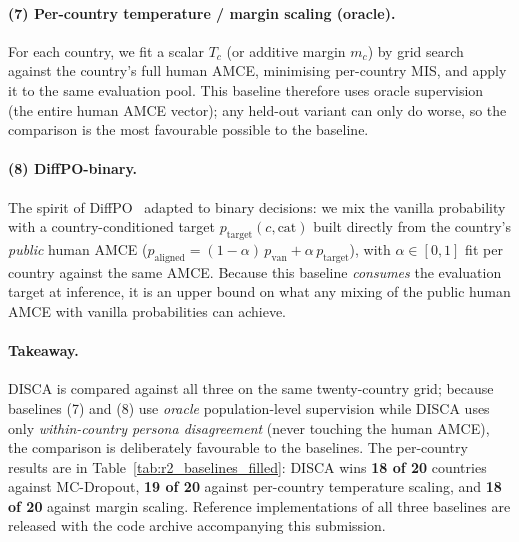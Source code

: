 \documentclass{article}
\begin{document}
\paragraph{(7) Per-country temperature / margin scaling (oracle).} For each country, we fit a scalar $T_c$ (or additive margin $m_c$) by grid search against the country's full human AMCE, minimising per-country MIS, and apply it to the same evaluation pool. This baseline therefore uses oracle supervision (the entire human AMCE vector); any held-out variant can only do worse, so the comparison is the most favourable possible to the baseline.

\paragraph{(8) DiffPO-binary.} The spirit of DiffPO~\citep{chen2025diffpo} adapted to binary decisions: we mix the vanilla probability with a country-conditioned target $p_{\text{target}}(c, \mathrm{cat})$ built directly from the country's \emph{public} human AMCE ($p_{\text{aligned}} = (1-\alpha)\,p_{\text{van}} + \alpha\,p_{\text{target}}$), with $\alpha \in [0,1]$ fit per country against the same AMCE. Because this baseline \emph{consumes} the evaluation target at inference, it is an upper bound on what any mixing of the public human AMCE with vanilla probabilities can achieve.

\paragraph{Takeaway.} DISCA is compared against all three on the same twenty-country grid; because baselines (7) and (8) use \emph{oracle} population-level supervision while DISCA uses only \emph{within-country persona disagreement} (never touching the human AMCE), the comparison is deliberately favourable to the baselines. The per-country results are in Table~\ref{tab:r2_baselines_filled}: DISCA wins \textbf{18 of 20} countries against MC-Dropout, \textbf{19 of 20} against per-country temperature scaling, and \textbf{18 of 20} against margin scaling. Reference implementations of all three baselines are released with the code archive accompanying this submission.
\end{document}
